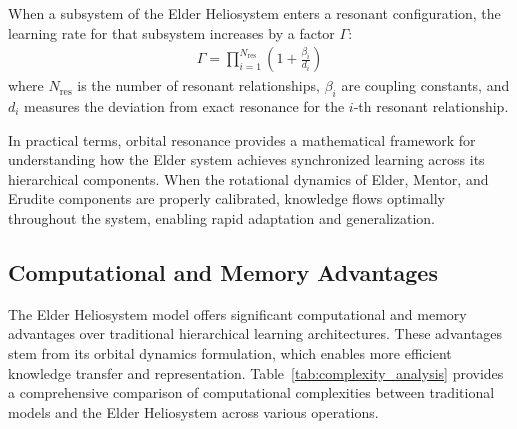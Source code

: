 \begin{corollary}
When a subsystem of the Elder Heliosystem enters a resonant configuration, the learning rate for that subsystem increases by a factor $\Gamma$:
\begin{align}
\Gamma = \prod_{i=1}^{N_{\text{res}}} \left(1 + \frac{\beta_i}{d_i}\right)
\end{align}
where $N_{\text{res}}$ is the number of resonant relationships, $\beta_i$ are coupling constants, and $d_i$ measures the deviation from exact resonance for the $i$-th resonant relationship.
\end{corollary}

In practical terms, orbital resonance provides a mathematical framework for understanding how the Elder system achieves synchronized learning across its hierarchical components. When the rotational dynamics of Elder, Mentor, and Erudite components are properly calibrated, knowledge flows optimally throughout the system, enabling rapid adaptation and generalization.

\subsection{Computational and Memory Advantages}

The Elder Heliosystem model offers significant computational and memory advantages over traditional hierarchical learning architectures. These advantages stem from its orbital dynamics formulation, which enables more efficient knowledge transfer and representation. Table~\ref{tab:complexity_analysis} provides a comprehensive comparison of computational complexities between traditional models and the Elder Heliosystem across various operations.

